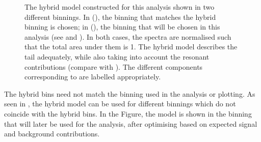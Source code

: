 \begin{figure}[hbtp!]
    \caption{\label{fig:hybrid_bins_and_model} The hybrid model constructed for this analysis 
    shown in two different binnings.
    In (), the binning that matches the hybrid binning is chosen; 
    in (), the binning that will 
    be chosen in this analysis (see  and ).
    In both cases, the spectra are normalised such that the total area under them is 1.
    The hybrid model describes the tail adequately, 
    while also taking into account the resonant contributions (compare with ).
    The different components corresponding to  are labelled appropriately.
    }
\end{figure}

The hybrid bins need not match the binning used in the analysis or plotting.
As seen in , the hybrid model can be used for different binnings which do not coincide with the hybrid bins.
In the Figure, the model is shown in the binning that will later be used for the analysis, after optimising based on expected signal and background contributions.

